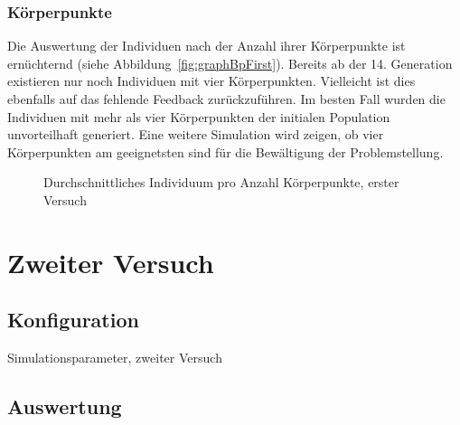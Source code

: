       \subsubsection{Körperpunkte\label{subsub:bp}}

        Die Auswertung der Individuen nach der Anzahl ihrer Körperpunkte ist ernüchternd (siehe Abbildung~\vref{fig:graphBpFirst}).
        Bereits ab der 14. Generation existieren nur noch Individuen mit vier Körperpunkten.
        Vielleicht ist dies ebenfalls auf das fehlende Feedback zurückzuführen.
        Im besten Fall wurden die Individuen mit mehr als vier Körperpunkten der initialen Population unvorteilhaft generiert.
        Eine weitere Simulation wird zeigen,
        ob vier Körperpunkten am geeignetsten sind für die Bewältigung der Problemstellung.

        \begin{figure}
          \centering
          
          \caption{Durchschnittliches Individuum pro Anzahl Körperpunkte, erster Versuch\label{fig:graphBpFirst}}
        \end{figure}

  \section{Zweiter Versuch}

    \subsection{Konfiguration}

      \begin{table}[H]
        \centering
        
        \caption{Simulationsparameter, zweiter Versuch}
      \end{table}

    \subsection{Auswertung\label{sub:scndAuswertung}}

